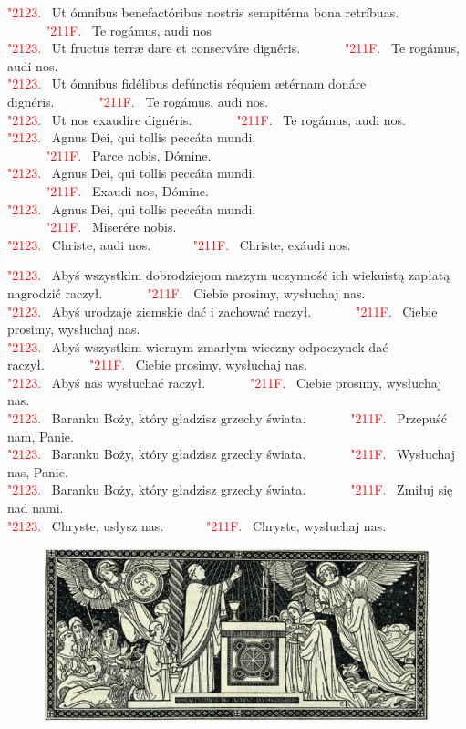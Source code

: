 \documentclass[10pt,a5paper]{book}
\newcommand{\kol}{red}
\newcommand{\textjuni}[1]{{\fontspec{Junicode-Regular}#1}}
\newcommand{\vv}{\textcolor{\kol}{\textjuni{\char"2123. }}}
\newcommand{\rrr}{\newline\textcolor{\kol}{\textjuni{~~~~~~\char"211F. }}}
\newcommand{\oremuss}[2]{
	\begin{sloppypar}
		\begin{paracol}{2}
			\setlength{\columnsep}{0em}
			\begin{leftcolumn}
				#1
			\end{leftcolumn}
			\begin{rightcolumn}
				#2
			\end{rightcolumn}
		\end{paracol}
	\end{sloppypar}}
\begin{document}
\oremuss{
	\vv Ut ómnibus benefactóribus nostris sempitérna bona retríbuas. \\ \rrr Te
	rogámus, audi nos\\
	\vv Ut fructus terræ dare et conserváre dignéris. \rrr Te rogámus, audi
	nos.\\
	\vv Ut ómnibus fidélibus defúnctis réquiem ætérnam donáre dignéris. \rrr Te
	rogámus, audi nos.\\
	\vv Ut nos exaudíre dignéris. \rrr Te rogámus, audi nos.\\
	\vv Agnus Dei, qui tollis peccáta mundi. \\ \rrr Parce nobis, Dómine.\\
	\vv Agnus Dei, qui tollis peccáta mundi. \\ \rrr Exaudi nos, Dómine.\\
	\vv Agnus Dei, qui tollis peccáta mundi. \\ \rrr Miserére nobis.\\
	\vv Christe, audi nos. \rrr Christe, exáudi nos.}{\vv Abyś wszystkim
	dobrodziejom naszym uczynność ich wiekuistą zapłatą nagrodzić
	raczył. \rrr Ciebie prosimy, wysłuchaj nas.\\
	\vv Abyś urodzaje ziemskie dać i zachować raczył. \rrr Ciebie prosimy,
	wysłuchaj nas.\\
	\vv Abyś wszystkim wiernym zmarłym wieczny odpoczynek dać
	raczył. \rrr Ciebie prosimy, wysłuchaj nas.\\
	\vv Abyś nas wysłuchać raczył. \rrr Ciebie prosimy, wysłuchaj nas.\\
	\vv Baranku Boży, który gładzisz grzechy świata. \rrr Przepuść nam, Panie.\\
	\vv Baranku Boży, który gładzisz grzechy świata. \rrr Wysłuchaj nas,
	Panie.\\
	\vv Baranku Boży, który gładzisz grzechy świata. \rrr Zmiłuj się nad nami.\\
	\vv Chryste, usłysz nas. \rrr Chryste, wysłuchaj nas.}

\vfill

\centerline{}

\vfill

\newpage

\begin{figure}[h]
	\centering
	\includegraphics[width=\linewidth]{3.jpg}
\end{figure}
\end{document}
